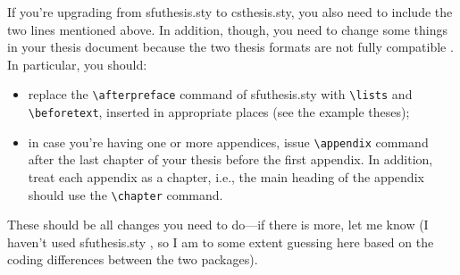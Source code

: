 If you're upgrading%
 from
\textsf{sfuthesis.sty} to \textsf{csthesis.sty}, you also need to
include the two lines mentioned above. In addition, though, you need
to change some things in your thesis document because the two thesis
formats are not fully compatible%
. In
particular, you should:
\begin{itemize}
\item replace the \verb+\afterpreface+ command of
  \textsf{sfuthesis.sty}
  with \verb+\lists+ and \verb+\beforetext+, inserted in appropriate
  places (see the example theses);
\item in case you're having one or more appendices, issue
  \verb+\appendix+ command after the last chapter of your thesis 
  before the first appendix. In addition, treat each appendix as a
  chapter, i.e., the main heading of the appendix should use the
  \verb+\chapter+ command.
\end{itemize}
These should be all changes you need to do---if there is more, let me
know (I haven't used \textsf{sfuthesis.sty}%
, so I am to some extent
guessing here based on the coding differences between the two packages).
